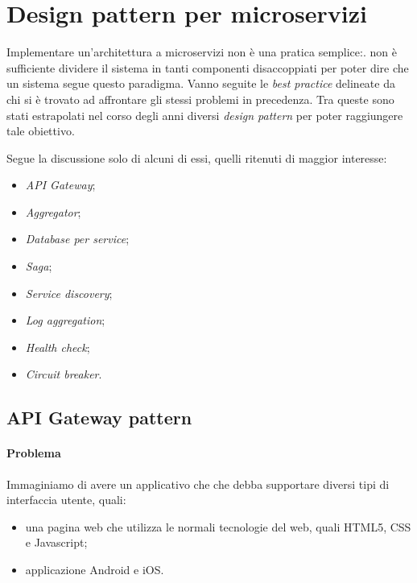 
\section{Design pattern per microservizi}

Implementare un'architettura a microservizi non è una pratica semplice:. non è sufficiente dividere il sistema in tanti componenti disaccoppiati per poter dire che un sistema segue questo paradigma.
Vanno seguite le \textit{best practice} delineate da chi si è trovato ad affrontare gli stessi problemi in precedenza.
Tra queste sono stati estrapolati nel corso degli anni diversi \textit{design pattern} per poter raggiungere tale obiettivo.

Segue la discussione solo di alcuni di essi, quelli ritenuti di maggior interesse:

\begin{itemize}
	\item \textit{API Gateway};
	\item \textit{Aggregator};

	\item \textit{Database per service};
	\item \textit{Saga};

	\item \textit{Service discovery};
	\item \textit{Log aggregation};
	\item \textit{Health check};
	\item \textit{Circuit breaker}.
\end{itemize}


\subsection{API Gateway pattern}\label{api-gateway}

\paragraph*{Problema} Immaginiamo di avere un applicativo che  che debba supportare diversi tipi di interfaccia utente, quali: 
\begin{itemize}[noitemsep]
	\item una pagina web che utilizza le normali tecnologie del web, quali HTML5, CSS e Javascript;
	\item applicazione Android e iOS.
\end{itemize}

